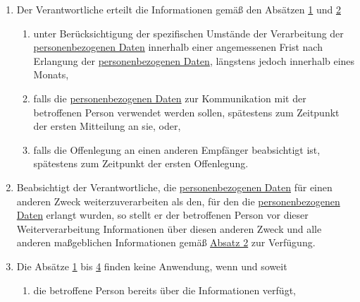 \begin{enumerate}
\begin{enumerate}
  \end{enumerate}

  \item Der Verantwortliche erteilt die Informationen gemäß den Absätzen \hyperref[itm:14-1]{1} und \hyperref[itm:14-2]
  {2}
  \label{itm:14-3}

  \begin{enumerate}
  
    \item unter Berücksichtigung der spezifischen Umstände der Verarbeitung der \hyperref[itm:04-1]{personenbezogenen Daten} innerhalb einer
     angemessenen Frist nach Erlangung der \hyperref[itm:04-1]{personenbezogenen Daten}, längstens jedoch innerhalb eines Monats,
    \label{itm:14-3a}

    \item falls die \hyperref[itm:04-1]{personenbezogenen Daten} zur Kommunikation mit der betroffenen Person verwendet werden sollen,
     spätestens zum Zeitpunkt der ersten Mitteilung an sie, oder,
    \label{itm:14-3b}

    \item falls die Offenlegung an einen anderen Empfänger beabsichtigt ist, spätestens zum Zeitpunkt der ersten
     Offenlegung.
    \label{itm:14-3c}

  \end{enumerate}

  \item Beabsichtigt der Verantwortliche, die \hyperref[itm:04-1]{personenbezogenen Daten} für einen anderen Zweck weiterzuverarbeiten als
   den, für den die \hyperref[itm:04-1]{personenbezogenen Daten} erlangt wurden, so stellt er der betroffenen Person vor dieser
   Weiterverarbeitung Informationen über diesen anderen Zweck und alle anderen maßgeblichen Informationen gemäß
   \hyperref[itm:14-2]{Absatz 2} zur Verfügung.
  \label{itm:14-4}

  \item Die Absätze \hyperref[itm:14-1]{1} bis \hyperref[itm:14-4]{4} finden keine Anwendung, wenn und soweit
  \label{itm:14-5}

  \begin{enumerate}
  
    \item die betroffene Person bereits über die Informationen verfügt,
    \label{itm:14-5a}


\end{enumerate}
\end{enumerate}

